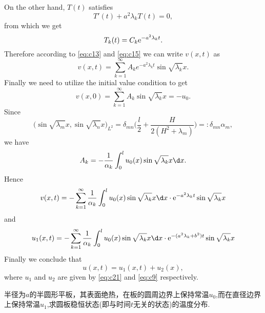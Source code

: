 \begin{solution}
    On the other hand, $T(t)$ satisfies
    \begin{equation}\label{eq:c14}
      T'(t) + a^2\lambda_k T(t) = 0,
    \end{equation}
    from which we get
    \begin{equation}\label{eq:c15}
      T_k(t) = C_k \mathrm{e}^{-a^2\lambda_k t}.
    \end{equation}
    Therefore according to \eqref{eq:c13} and \eqref{eq:c15} we can write $v(x,t)$ as
    \begin{equation}\label{eq:c16}
      v(x,t) = \sum_{k=1}^\infty A_k e^{-a^2\lambda_k t} \sin\sqrt{\lambda_k} x.
    \end{equation}
    Finally we need to utilize the initial value condition to get
    \begin{equation}\label{eq:c17}
      v(x,0) = \sum_{k=1}^\infty A_k \sin\sqrt{\lambda_k} x = -u_0.
    \end{equation}
    Since
    \begin{equation}\label{eq:c18}
      \bigl(\sin\sqrt{\lambda_m}x, \sin\sqrt{\lambda_n}x\bigr)_{L^2}
       = \delta_{mn} \biggl(\frac{l}{2} + \frac{H}{2(H^2+\lambda_m)}\biggr)
       =: \delta_{mn} \alpha_m,
    \end{equation}
    we have
    \begin{equation}\label{eq:c19}
      A_k = -\frac{1}{\alpha_k} \int_0^l u_0(x) \sin\sqrt{\lambda_k} x \d x.
    \end{equation}
    Hence
    \begin{equation}\label{eq:c20}
      v(x,t) = -\sum_{k=1}^\infty \frac{1}{\alpha_k}
        \int_0^l u_0(x) \sin\sqrt{\lambda_k}x \d x \cdot
        \e^{-a^2\lambda_k t} \sin\sqrt{\lambda_k} x
    \end{equation}
    and
    \begin{equation}\label{eq:c21}
      u_1(x,t) = -\sum_{k=1}^\infty \frac{1}{\alpha_k}
        \int_0^l u_0(x) \sin\sqrt{\lambda_k}x \d x \cdot
        \e^{-(a^2\lambda_k + b^2)t} \sin\sqrt{\lambda_k} x
    \end{equation}
    Finally we conclude that
    \begin{equation}\label{eq:c22}
      u(x,t) = u_1(x,t) + u_2(x),
    \end{equation}
    where $u_1$ and $u_2$ are given by \eqref{eq:c21} and \eqref{eq:c9}
    respectively.
\end{solution}


\begin{exercise}
	半径为$a$的半圆形平板，其表面绝热，在板的圆周边界上保持常温$u_0$,而在直径边界上保持常温$u_1$,求圆板稳恒状态(即与时间$t$无关的状态)的温度分布.
\end{exercise}

